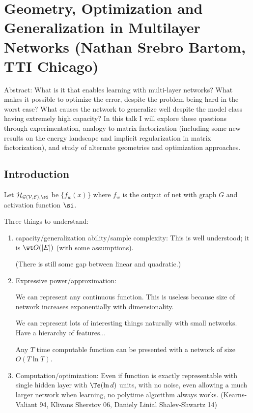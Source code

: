 \section{Geometry, Optimization and Generalization in Multilayer Networks (Nathan Srebro Bartom, TTI Chicago)}

Abstract: What is it that enables learning with multi-layer networks?  What makes it possible to optimize the error, despite the problem being
hard in the worst case?  What causes the network to generalize well despite the model class having extremely high capacity?  In this talk I will explore these questions through experimentation, analogy to matrix factorization (including some new results on the energy
landscape and implicit regularization in matrix factorization), and study of alternate geometries and optimization approaches.

\subsection{Introduction}

Let $\cal H_{G(V,E),\si}$ be $\{f_w(x)\}$ where $f_w$ is the output of net with graph $G$ and activation function $\si$.

Three things to understand: 
\begin{enumerate}
\item
capacity/generalization ability/sample complexity: This is well understood; it is $\wt O(|E|)$ (with some assumptions).

(There is still some gap between linear and quadratic.)
\item
Expressive power/approximation: 

We can represent any continuous function. This is useless because size of network increases exponentially with dimensionality. 

We can represent lots of interesting things naturally with small networks. Have a hierarchy of features...

Any $T$ time computable function can be presented with a network of size $O(T\ln T)$. 
\item
Computation/optimization: Even if function is exactly representable with single hidden layer with $\Te(\ln d)$ units, with no noise, even allowing a much larger network when learning, no polytime algorithm always works. (Kearns-Valiant 94, Klivans Sherstov 06, Daniely Linial Shalev-Shwartz 14)
\end{enumerate}

